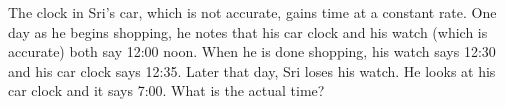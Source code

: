 The clock in Sri's car, which is not accurate, gains time at a constant rate. One day as he begins shopping, he notes that his car clock and his watch (which is accurate) both say 12:00 noon. When he is done shopping, his watch says 12:30 and his car clock says 12:35. Later that day, Sri loses his watch. He looks at his car clock and it says 7:00. What is the actual time?
